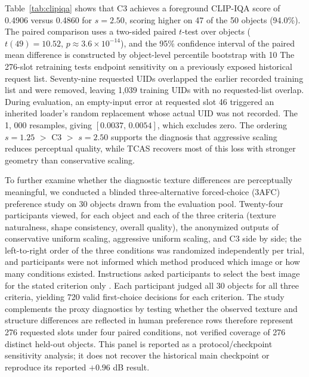 \documentclass[times,twocolumn,final]{elsarticle}
\providecommand{\DIFadd}[1]{{\protect\color{blue} \sf #1}} %
\providecommand{\DIFdel}[1]{{\protect\color{red} \scriptsize #1}} %
\providecommand{\DIFaddbegin}{} %
\providecommand{\DIFaddend}{} %
\providecommand{\DIFdelbegin}{} %
\providecommand{\DIFdelend}{} %
\begin{document}
\DIFdelbegin \DIFdel{Table~\ref{tab:clipiqa} shows that C3 achieves a foreground CLIP-IQA score of 0.4906 versus 0.4860 for $s = 2.50$, scoring higher on 47 of the 50 objects (94.0\%). The paired comparison uses a two-sided paired $t$-test over objects ($t(49)=10.52$, $p\approx3.6\times10^{-14}$), and the 95\% confidence interval of the paired mean difference is constructed by object-level percentile bootstrap with 10}%
\DIFdelend \DIFaddbegin \DIFadd{The 276-slot retraining tests endpoint sensitivity on a previously exposed historical request list. Seventy-nine requested UIDs overlapped the earlier recorded training list and were removed, leaving 1,039 training UIDs with no requested-list overlap. During evaluation, an empty-input error at requested slot 46 triggered an inherited loader's random replacement whose actual UID was not recorded. The 1}\DIFaddend ,\DIFdelbegin %
\DIFdel{000 resamples, giving $[0.0037,\,0.0054]$, which excludes zero. The ordering $s = 1.25$ $>$ C3 $>$ $s = 2.50$ supports the diagnosis that aggressive scaling reduces perceptual quality, while TCAS recovers most of this loss with stronger geometry than conservative scaling.
}%

\DIFdel{To further examine whether the diagnostic texture differences are perceptually meaningful, we conducted a blinded three-alternative forced-choice (3AFC) preference study on 30 objects drawn from the evaluation pool. Twenty-four participants viewed, for each object and each of the three criteria (texture naturalness, shape consistency, overall quality), the anonymized outputs of conservative uniform scaling, aggressive uniform scaling, and C3 side by side; the left-to-right order of the three conditions was randomized independently per trial, and participants were not informed which method produced which image or how many conditions existed. Instructions asked participants to select the best image for the stated criterion only . Each participant judged all 30 objects for all three criteria, yielding 720 valid first-choice decisions for each criterion. The study complements the proxy diagnostics by testing whether the observed texture and structure differences are reflected in human preference}\DIFdelend \DIFaddbegin \DIFadd{104 rows therefore represent 276 requested slots under four paired conditions, not verified coverage of 276 distinct held-out objects. This panel is reported as a protocol/checkpoint sensitivity analysis; it does not recover the historical main checkpoint or reproduce its reported $+0.96$ dB result}\DIFaddend .
\end{document}
